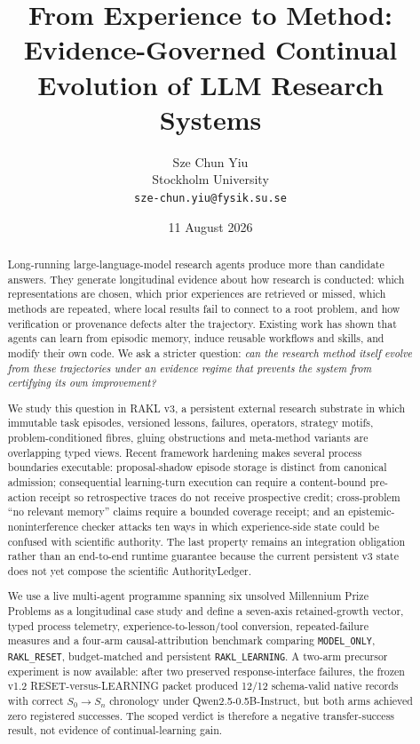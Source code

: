 \documentclass[11pt]{article}
\title{From Experience to Method: Evidence-Governed Continual Evolution of LLM Research Systems}
\author{Sze Chun Yiu\\Stockholm University\\\texttt{sze-chun.yiu@fysik.su.se}}
\date{11 August 2026}
\newcommand{\RAKL}{\textsc{RAKL}}
\begin{document}
\sloppy
\maketitle

\begin{abstract}
Long-running large-language-model research agents produce more than candidate answers. They generate longitudinal evidence about how research is conducted: which representations are chosen, which prior experiences are retrieved or missed, which methods are repeated, where local results fail to connect to a root problem, and how verification or provenance defects alter the trajectory. Existing work has shown that agents can learn from episodic memory, induce reusable workflows and skills, and modify their own code. We ask a stricter question: \emph{can the research method itself evolve from these trajectories under an evidence regime that prevents the system from certifying its own improvement?}

We study this question in \RAKL{} v3, a persistent external research substrate in which immutable task episodes, versioned lessons, failures, operators, strategy motifs, problem-conditioned fibres, gluing obstructions and meta-method variants are overlapping typed views. Recent framework hardening makes several process boundaries executable: proposal-shadow episode storage is distinct from canonical admission; consequential learning-turn execution can require a content-bound pre-action receipt so retrospective traces do not receive prospective credit; cross-problem ``no relevant memory'' claims require a bounded coverage receipt; and an epistemic-noninterference checker attacks ten ways in which experience-side state could be confused with scientific authority. The last property remains an integration obligation rather than an end-to-end runtime guarantee because the current persistent v3 state does not yet compose the scientific AuthorityLedger.

We use a live multi-agent programme spanning six unsolved Millennium Prize Problems as a longitudinal case study and define a seven-axis retained-growth vector, typed process telemetry, experience-to-lesson/tool conversion, repeated-failure measures and a four-arm causal-attribution benchmark comparing \texttt{MODEL\_ONLY}, \texttt{RAKL\_RESET}, budget-matched  and persistent \texttt{RAKL\_LEARNING}. A two-arm precursor experiment is now available: after two preserved response-interface failures, the frozen v1.2 RESET-versus-LEARNING packet produced 12/12 schema-valid native records with correct $S_0\rightarrow S_n$ chronology under Qwen2.5-0.5B-Instruct, but both arms achieved zero registered successes. The scoped verdict is therefore a negative transfer-success result, not evidence of continual-learning gain.


\end{abstract}
\end{document}
